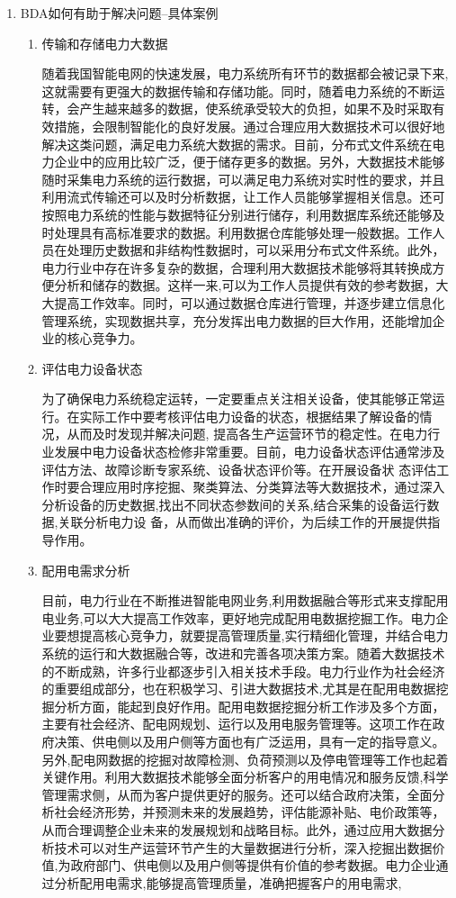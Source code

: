 \documentclass{article}
\begin{document}
\begin{enumerate}
  
  \item BDA如何有助于解决问题--具体案例\par 
  \begin{enumerate}
      \item 传输和存储电力大数据 \par
\hspace{2em}随着我国智能电网的快速发展，电力系统所有环节的数据都会被记录下来,这就需要有更强大的数据传输和存储功能。同时，随着电力系统的不断运转，会产生越来越多的数据，使系统承受较大的负担，如果不及时采取有效措施，会限制智能化的良好发展。通过合理应用大数据技术可以很好地解决这类问题，满足电力系统大数据的需求。目前，分布式文件系统在电力企业中的应用比较广泛，便于储存更多的数据。另外，大数据技术能够随时采集电力系统的运行数据，可以满足电力系统对实时性的要求，并且利用流式传输还可以及时分析数据，让工作人员能够掌握相关信息。还可按照电力系统的性能与数据特征分别进行储存，利用数据库系统还能够及时处理具有高标准要求的数据。利用数据仓库能够处理一般数据。工作人员在处理历史数据和非结构性数据时，可以采用分布式文件系统。此外，电力行业中存在许多复杂的数据，合理利用大数据技术能够将其转换成方便分析和储存的数据。这样一来,可以为工作人员提供有效的参考数据，大大提高工作效率。同时，可以通过数据仓库进行管理，并逐步建立信息化管理系统，实现数据共享，充分发挥出电力数据的巨大作用，还能增加企业的核心竞争力。
      \item 评估电力设备状态 \par
\hspace{2em}为了确保电力系统稳定运转，一定要重点关注相关设备，使其能够正常运行。在实际工作中要考核评估电力设备的状态，根据结果了解设备的情况，从而及时发现并解决问题,
提高各生产运营环节的稳定性。在电力行业发展中电力设备状态检修非常重要。目前，电力设备状态评估通常涉及评估方法、故障诊断专家系统、设备状态评价等。在开展设备状
态评估工作时要合理应用时序挖掘、聚类算法、分类算法等大数据技术，通过深入分析设备的历史数据,找出不同状态参数间的关系,结合采集的设备运行数据,关联分析电力设
备，从而做出准确的评价，为后续工作的开展提供指导作用。
      \item 配用电需求分析 \par
\hspace{2em}目前，电力行业在不断推进智能电网业务,利用数据融合等形式来支撑配用电业务,可以大大提高工作效率，更好地完成配用电数据挖掘工作。电力企业要想提高核心竞争力，就要提高管理质量,实行精细化管理，并结合电力系统的运行和大数据融合等，改进和完善各项决策方案。随着大数据技术的不断成熟，许多行业都逐步引入相关技术手段。电力行业作为社会经济的重要组成部分，也在积极学习、引进大数据技术,尤其是在配用电数据挖掘分析方面，能起到良好作用。配用电数据挖掘分析工作涉及多个方面，主要有社会经济、配电网规划、运行以及用电服务管理等。这项工作在政府决策、供电侧以及用户侧等方面也有广泛运用，具有一定的指导意义。另外,配电网数据的挖掘对故障检测、负荷预测以及停电管理等工作也起着关键作用。利用大数据技术能够全面分析客户的用电情况和服务反馈,科学管理需求侧，从而为客户提供更好的服务。还可以结合政府决策，全面分析社会经济形势，并预测未来的发展趋势，评估能源补贴、电价政策等，从而合理调整企业未来的发展规划和战略目标。此外，通过应用大数据分析技术可以对生产运营环节产生的大量数据进行分析，深入挖掘出数据价值,为政府部门、供电侧以及用户侧等提供有价值的参考数据。电力企业通过分析配用电需求,能够提高管理质量，准确把握客户的用电需求,

\end{enumerate}
\end{enumerate}
\end{document}
